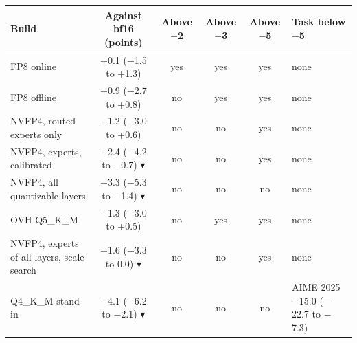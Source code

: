 \begin{tabular}{@{}lccccl@{}}
\toprule
Build & Against bf16 (points) & Above $-$2 & Above $-$3 & Above $-$5 & Task below $-$5 \\
\midrule
FP8 online & $-$0.1 ($-$1.5 to +1.3) & \cellcolor[HTML]{CDEBDD}yes & \cellcolor[HTML]{CDEBDD}yes & \cellcolor[HTML]{CDEBDD}yes & none \\
FP8 offline & $-$0.9 ($-$2.7 to +0.8) & no & \cellcolor[HTML]{CDEBDD}yes & \cellcolor[HTML]{CDEBDD}yes & none \\
NVFP4, routed experts only & $-$1.2 ($-$3.0 to +0.6) & no & no & \cellcolor[HTML]{CDEBDD}yes & none \\
NVFP4, experts, calibrated & \cellcolor[HTML]{F6D3C9}$-$2.4 ($-$4.2 to $-$0.7) \textcolor[HTML]{B4452A}{$\blacktriangledown$} & no & no & \cellcolor[HTML]{CDEBDD}yes & none \\
NVFP4, all quantizable layers & \cellcolor[HTML]{F6D3C9}$-$3.3 ($-$5.3 to $-$1.4) \textcolor[HTML]{B4452A}{$\blacktriangledown$} & no & no & no & none \\
OVH Q5\_K\_M & $-$1.3 ($-$3.0 to +0.5) & no & \cellcolor[HTML]{CDEBDD}yes & \cellcolor[HTML]{CDEBDD}yes & none \\
NVFP4, experts of all layers, scale search & \cellcolor[HTML]{F6D3C9}$-$1.6 ($-$3.3 to 0.0) \textcolor[HTML]{B4452A}{$\blacktriangledown$} & no & no & \cellcolor[HTML]{CDEBDD}yes & none \\
Q4\_K\_M stand-in & \cellcolor[HTML]{F6D3C9}$-$4.1 ($-$6.2 to $-$2.1) \textcolor[HTML]{B4452A}{$\blacktriangledown$} & \cellcolor[HTML]{F6D3C9}no & no & no & AIME 2025 $-$15.0 ($-$22.7 to $-$7.3) \\
\bottomrule
\end{tabular}
